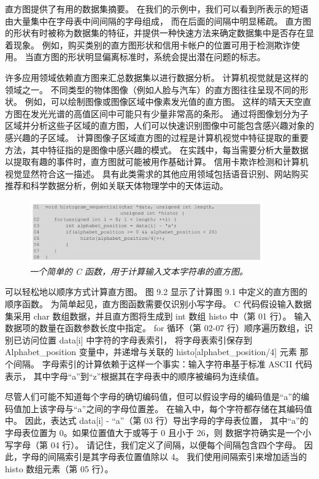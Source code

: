 直方图提供了有用的数据集摘要。 在我们的示例中，我们可以看到所表示的短语由大量集中在字母表中间间隔的字母组成，
而在后面的间隔中明显稀疏。 直方图的形状有时被称为数据集的特征，并提供一种快速方法来确定数据集中是否存在显着现象。 
例如，购买类别的直方图形状和信用卡帐户的位置可用于检测欺诈使用。 当直方图的形状明显偏离标准时，系统会提出潜在问题的标志。

许多应用领域依赖直方图来汇总数据集以进行数据分析。 计算机视觉就是这样的领域之一。 
不同类型的物体图像（例如人脸与汽车）的直方图往往呈现不同的形状。 例如，可以绘制图像或图像区域中像素发光值的直方图。 
这样的晴天天空直方图在发光光谱的高值区间中可能只有少量非常高的条形。 
通过将图像划分为子区域并分析这些子区域的直方图，人们可以快速识别图像中可能包含感兴趣对象的感兴趣的子区域。 
计算图像子区域直方图的过程是计算机视觉中特征提取的重要方法，其中特征指的是图像中感兴趣的模式。 
在实践中，每当需要分析大量数据以提取有趣的事件时，直方图就可能被用作基础计算。 信用卡欺诈检测和计算机视觉显然符合这一描述。 
具有此类需求的其他应用领域包括语音识别、网站购买推荐和科学数据分析，例如关联天体物理学中的天体运动。

\begin{figure}[H]
	\centering
	\includegraphics[width=0.9\textwidth]{figs/F9.2.png}
	\caption{\textit{一个简单的 C 函数，用于计算输入文本字符串的直方图。}}
\end{figure}

可以轻松地以顺序方式计算直方图。 图 9.2 显示了计算图 9.1 中定义的直方图的顺序函数。 
为简单起见，直方图函数需要仅识别小写字母。 
C 代码假设输入数据集采用 char 数组数据，并且直方图将生成到 int 数组 histo 中（第 01 行）。 
输入数据项的数量在函数参数长度中指定。 
for 循环（第 02-07 行）顺序遍历数组，识别已访问位置 data[i] 中字符的字母表索引，
将字母表索引保存到 Alphabet\_position 变量中，并递增与关联的 histo[alphabet\_position/4] 元素 那个间隔。 
字母索引的计算依赖于这样一个事实：输入字符串基于标准 ASCII 代码表示，
其中字母“a”到“z”根据其在字母表中的顺序被编码为连续值。

尽管人们可能不知道每个字母的确切编码值，但可以假设字母的编码值是“a”的编码值加上该字母与“a”之间的字母位置差。 
在输入中，每个字符都存储在其编码值中。 因此，表达式 data[i] - “a”（第 03 行）导出字母的字母表位置，
其中“a”的字母表位置为 0。如果位置值大于或等于 0 且小于 26，则 数据字符确实是一个小写字母（第 04 行）。 
请记住，我们定义了间隔，以便每个间隔包含四个字母。 因此，字母的间隔索引是其字母表位置值除以 4。
我们使用间隔索引来增加适当的 histo 数组元素（第 05 行）。


